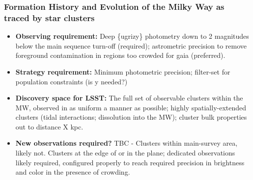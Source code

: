\subsubsection{Formation History and Evolution of the Milky Way as traced by star clusters}
\vspace{-2mm}
\begin{itemize}
\item {\bf Observing requirement:} Deep \{ugrizy\} photometry down to 2 magnitudes below the main sequence turn-off (required); astrometric precision to remove foreground contamination in regions too crowded for gaia (preferred).
\vspace{-2mm}

\item {\bf Strategy requirement:} Minimum photometric precision; filter-set for population constraints (is y needed?)
\vspace{-2mm}

\item {\bf Discovery space for LSST:} The full set of observable clusters within the MW, observed in as uniform a manner as possible; highly spatially-extended clusters (tidal interactions; dissolution into the MW); cluster bulk properties out to distance X kpc.
\vspace{-2mm}

\item {\bf New observations required?} TBC - Clusters within main-survey area, likely not. Clusters at the edge of or in the plane; dedicated observations likely required, configured properly to reach required precision in brightness and color in the presence of crowding.
\vspace{-2mm}
\end{itemize}


